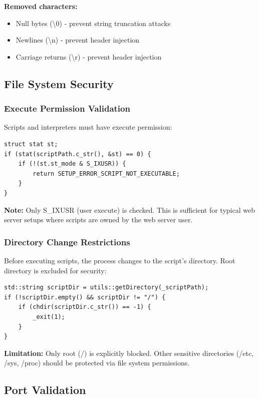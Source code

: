 \documentclass[11pt,a4paper]{article}
\begin{document}
\textbf{Removed characters:}
\begin{itemize}
    \item Null bytes (\textbackslash 0) - prevent string truncation attacks
    \item Newlines (\textbackslash n) - prevent header injection
    \item Carriage returns (\textbackslash r) - prevent header injection
\end{itemize}

\subsection{File System Security}

\subsubsection{Execute Permission Validation}

Scripts and interpreters must have execute permission:

\begin{lstlisting}[caption=Permission Check]
struct stat st;
if (stat(scriptPath.c_str(), &st) == 0) {
    if (!(st.st_mode & S_IXUSR)) {
        return SETUP_ERROR_SCRIPT_NOT_EXECUTABLE;
    }
}
\end{lstlisting}

\textbf{Note:} Only S\_IXUSR (user execute) is checked. This is sufficient for typical web server setups where scripts are owned by the web server user.

\subsubsection{Directory Change Restrictions}

Before executing scripts, the process changes to the script's directory. Root directory is excluded for security:

\begin{lstlisting}[caption=chdir Security]
std::string scriptDir = utils::getDirectory(_scriptPath);
if (!scriptDir.empty() && scriptDir != "/") {
    if (chdir(scriptDir.c_str()) == -1) {
        _exit(1);
    }
}
\end{lstlisting}

\textbf{Limitation:} Only root (/) is explicitly blocked. Other sensitive directories (/etc, /sys, /proc) should be protected via file system permissions.

\subsection{Port Validation}
\end{document}
